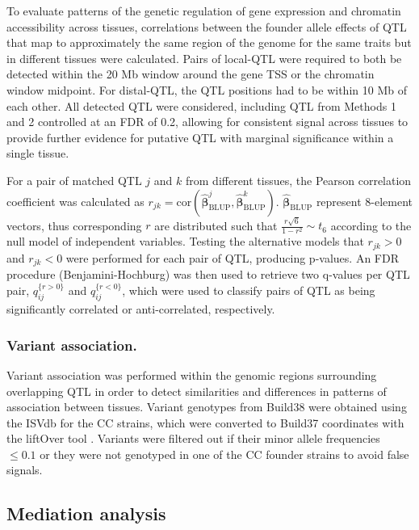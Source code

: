 \documentclass[9pt,twocolumn,twoside]{gsajnl}
\newcommand{\bbeta}{\boldsymbol{\beta}}
\begin{document}
To evaluate patterns of the genetic regulation of gene expression and chromatin accessibility across tissues, correlations between the founder allele effects of QTL that map to approximately the same region of the genome for the same traits but in different tissues were calculated. Pairs of local-QTL were required to both be detected within the 20 Mb window around the gene TSS or the chromatin window midpoint. For distal-QTL, the QTL positions had to be within 10 Mb of each other. All detected QTL were considered, including QTL from Methods 1 and 2 controlled at an FDR of 0.2, allowing for consistent signal across tissues to provide further evidence for putative QTL with marginal significance within a single tissue.

For a pair of matched QTL $j$ and $k$ from different tissues, the Pearson correlation coefficient was calculated as $r_{jk} = \text{cor}(\widehat{\bbeta}_{\text{BLUP}}^{j}, \widehat{\bbeta}_{\text{BLUP}}^{k})$. $\widehat{\bbeta}_{\text{BLUP}}$ represent 8-element vectors, thus corresponding $r$ are distributed such that $\frac{r\sqrt{6}}{1 - r^{2}} \sim t_{6}$ according to the null model of independent variables. Testing the alternative models that $r_{jk} > 0$ and $r_{jk} < 0$ were performed for each pair of QTL, producing p-values. An FDR procedure (Benjamini-Hochburg) was then used to retrieve two q-values per QTL pair, $q_{ij}^{\{r > 0\}}$ and $q_{ij}^{\{r < 0\}}$, which were used to classify pairs of QTL as being significantly correlated or anti-correlated, respectively. 

\subsubsection{Variant association.}

Variant association was performed within the genomic regions surrounding overlapping QTL in order to detect similarities and differences in patterns of association between tissues. Variant genotypes from Build38 were obtained using the ISVdb \citep{Oreper2017} for the CC strains, which were converted to Build37 coordinates with the liftOver tool \citep{Lawrence2009}. Variants were filtered out if their minor allele frequencies $\le 0.1$ or they were not genotyped in one of the CC founder strains to avoid false signals.

\subsection{Mediation analysis}
\end{document}
